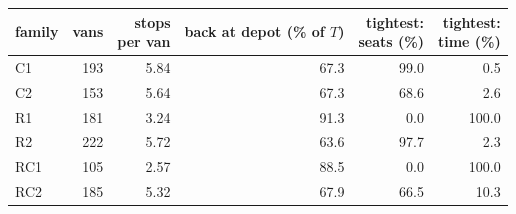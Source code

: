\begin{tabular}{@{}lrrrrr@{}}
\toprule
family & vans & \shortstack[r]{stops\\per van} & \shortstack[r]{back at depot\\(\% of $T$)} & \shortstack[r]{tightest:\\seats (\%)} & \shortstack[r]{tightest:\\time (\%)} \\
\midrule
C1 & 193 & 5.84 & 67.3 & 99.0 & 0.5 \\
C2 & 153 & 5.64 & 67.3 & 68.6 & 2.6 \\
R1 & 181 & 3.24 & 91.3 & 0.0 & 100.0 \\
R2 & 222 & 5.72 & 63.6 & 97.7 & 2.3 \\
RC1 & 105 & 2.57 & 88.5 & 0.0 & 100.0 \\
RC2 & 185 & 5.32 & 67.9 & 66.5 & 10.3 \\
\bottomrule
\end{tabular}
